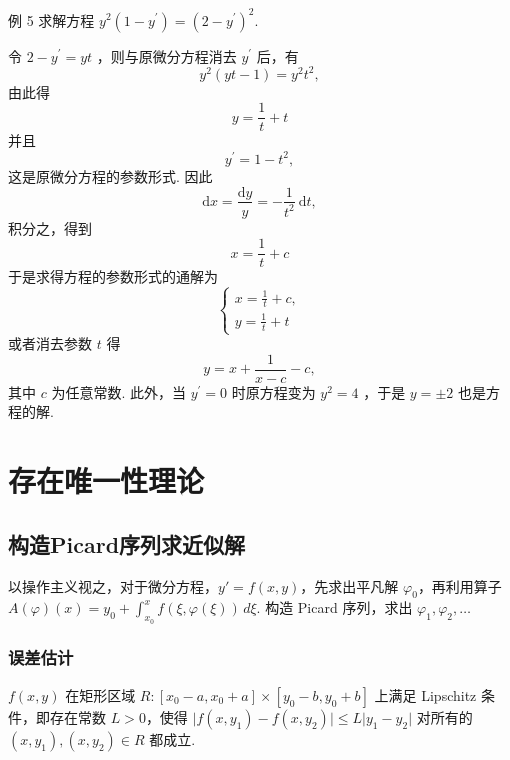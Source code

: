\begin{example}
    例 5 求解方程 $y^2\left(1-y^{\prime}\right)=\left(2-y^{\prime}\right)^2$.
\end{example}

\begin{solution}
    令 $2-y^{\prime}=y t$ ，则与原微分方程消去 $y^{\prime}$ 后，有
    $$
        y^2(y t-1)=y^2 t^2,
    $$
    由此得
    $$
        y=\frac{1}{t}+t
    $$
    并且
    $$
        y^{\prime}=1-t^2,
    $$
    这是原微分方程的参数形式. 因此
    $$
        \mathrm{d} x=\frac{\mathrm{d} y}{y}=-\frac{1}{t^2} \mathrm{~d} t,
    $$
    积分之，得到
    $$
        x=\frac{1}{t}+c
    $$
    于是求得方程的参数形式的通解为
    $$
        \left\{\begin{array}{l}
            x=\frac{1}{t}+c, \\
            y=\frac{1}{t}+t
        \end{array}\right.
    $$
    或者消去参数 $t$ 得
    $$
        y=x+\frac{1}{x-c}-c,
    $$
    其中 $c$ 为任意常数.
    此外，当 $y^{\prime}=0$ 时原方程变为 $y^2=4$ ，于是 $y= \pm 2$ 也是方程的解.
\end{solution}


\section{存在唯一性理论}

\subsection{构造Picard序列求近似解}

\begin{note}
    以操作主义视之，对于微分方程，$\displaystyle y'=f(x,y)$，先求出平凡解 $\displaystyle \varphi_{0}$，再利用算子 $\displaystyle A(\varphi)(x)=y_{0}+\int_{x_{0}}^{x} f(\xi,\varphi(\xi)) \, d\xi$. 构造 Picard 序列，求出 $\displaystyle \varphi_{1},\varphi_{2},\dots$
\end{note}

\subsubsection{误差估计}

$\displaystyle f(x,y)$ 在矩形区域 $\displaystyle R:[x_{0}-a,x_{0}+a]\times[y_{0}-b,y_{0}+b]$ 上满足 Lipschitz 条件，即存在常数 $\displaystyle L>0$，使得 $\displaystyle \lvert f(x,y_{1})-f(x,y_{2}) \rvert\leq L\lvert y_{1}-y_{2} \rvert$ 对所有的 $\displaystyle (x, y_{1}), (x, y_{2})\in R$ 都成立.

